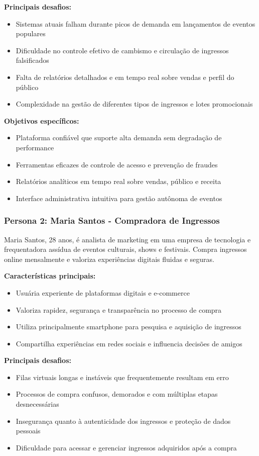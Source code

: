 \textbf{Principais desafios:}
\begin{itemize}
    \item Sistemas atuais falham durante picos de demanda em lançamentos de eventos populares
    \item Dificuldade no controle efetivo de cambismo e circulação de ingressos falsificados
    \item Falta de relatórios detalhados e em tempo real sobre vendas e perfil do público
    \item Complexidade na gestão de diferentes tipos de ingressos e lotes promocionais
\end{itemize}

\textbf{Objetivos específicos:}
\begin{itemize}
    \item Plataforma confiável que suporte alta demanda sem degradação de performance
    \item Ferramentas eficazes de controle de acesso e prevenção de fraudes
    \item Relatórios analíticos em tempo real sobre vendas, público e receita
    \item Interface administrativa intuitiva para gestão autônoma de eventos
\end{itemize}

\subsubsection{Persona 2: Maria Santos - Compradora de Ingressos}

Maria Santos, 28 anos, é analista de marketing em uma empresa de tecnologia e frequentadora assídua de eventos culturais, shows e festivais. Compra ingressos online mensalmente e valoriza experiências digitais fluidas e seguras.

\textbf{Características principais:}
\begin{itemize}
    \item Usuária experiente de plataformas digitais e e-commerce
    \item Valoriza rapidez, segurança e transparência no processo de compra
    \item Utiliza principalmente smartphone para pesquisa e aquisição de ingressos
    \item Compartilha experiências em redes sociais e influencia decisões de amigos
\end{itemize}

\textbf{Principais desafios:}
\begin{itemize}
    \item Filas virtuais longas e instáveis que frequentemente resultam em erro
    \item Processos de compra confusos, demorados e com múltiplas etapas desnecessárias
    \item Insegurança quanto à autenticidade dos ingressos e proteção de dados pessoais
    \item Dificuldade para acessar e gerenciar ingressos adquiridos após a compra
\end{itemize}

